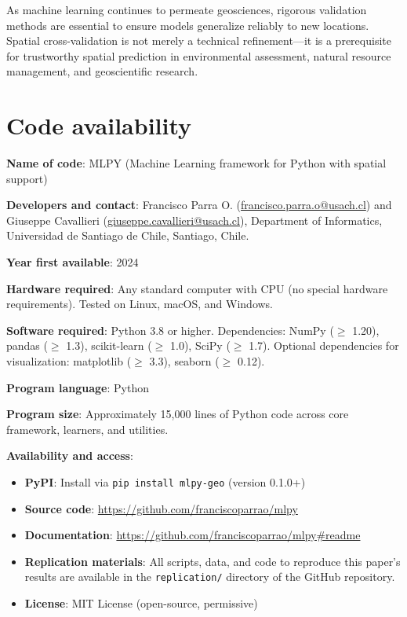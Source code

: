\documentclass[a4paper,fleqn]{cas-sc}
\begin{document}
As machine learning continues to permeate geosciences, rigorous validation methods are essential to ensure models generalize reliably to new locations. Spatial cross-validation is not merely a technical refinement---it is a prerequisite for trustworthy spatial prediction in environmental assessment, natural resource management, and geoscientific research.


\section*{Code availability}

\textbf{Name of code}: MLPY (Machine Learning framework for Python with spatial support)

\textbf{Developers and contact}: Francisco Parra O. (\href{mailto:francisco.parra.o@usach.cl}{francisco.parra.o@usach.cl}) and Giuseppe Cavallieri (\href{mailto:giuseppe.cavallieri@usach.cl}{giuseppe.cavallieri@usach.cl}), Department of Informatics, Universidad de Santiago de Chile, Santiago, Chile.

\textbf{Year first available}: 2024

\textbf{Hardware required}: Any standard computer with CPU (no special hardware requirements). Tested on Linux, macOS, and Windows.

\textbf{Software required}: Python 3.8 or higher. Dependencies: NumPy ($\geq$ 1.20), pandas ($\geq$ 1.3), scikit-learn ($\geq$ 1.0), SciPy ($\geq$ 1.7). Optional dependencies for visualization: matplotlib ($\geq$ 3.3), seaborn ($\geq$ 0.12).

\textbf{Program language}: Python

\textbf{Program size}: Approximately 15,000 lines of Python code across core framework, learners, and utilities.

\textbf{Availability and access}:
\begin{itemize}
\item \textbf{PyPI}: Install via \texttt{pip install mlpy-geo} (version 0.1.0+)
\item \textbf{Source code}: \url{https://github.com/franciscoparrao/mlpy}
\item \textbf{Documentation}: \url{https://github.com/franciscoparrao/mlpy#readme}
\item \textbf{Replication materials}: All scripts, data, and code to reproduce this paper's results are available in the \texttt{replication/} directory of the GitHub repository.
\item \textbf{License}: MIT License (open-source, permissive)
\end{itemize}
\end{document}
